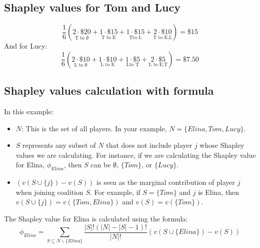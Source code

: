 \documentclass[12pt]{article}
\begin{document}
\subsection{Shapley values for Tom and Lucy}
\begin{equation}
\frac{1}{6} \left( 
\underset{\text{T to } \emptyset}{2 \cdot \$20} + 
\underset{\text{T to E}}{1 \cdot \$15} + 
\underset{\text{Tto L}}{1 \cdot \$15} + 
\underset{\text{T to E,L}}{2 \cdot \$10} 
\right) = \$15
\label{eq:tom_shapley}
\end{equation}
And for Lucy:
\begin{equation}
\frac{1}{6} \left( 
\underset{\text{L to } \emptyset}{2 \cdot \$10} + 
\underset{\text{L to E}}{1 \cdot \$10} + 
\underset{\text{Lto T}}{1 \cdot \$5} + 
\underset{\text{L to E,T}}{2 \cdot \$5} 
\right) = \$7.50
\label{eq:lucy_shapley}
\end{equation}

\subsection{Shapley values calculation with formula }
In this example:
\begin{itemize}
	\item \(N\): This is the set of all players. In your example, \(N = \{Elina, Tom, Lucy\}\).
	\item \(S\) represents any subset of \(N\) that does not include player \(j\) whose Shapley values we are calculating. For instance, if we are calculating the Shapley value for Elina, \(\phi_{Elina}\), then \(S\) can be \(\emptyset\), \(\{Tom\}\), or \(\{Lucy\}\).
	\item \((v(S \cup \{j\}) - v(S))\) is seen as the marginal contribution of player \(j\) when joining coalition \(S\). For example, if \(S = \{Tom\}\) and \(j\) is Elina, then \(v(S \cup \{j\}) = v(\{Tom, Elina\})\) and \(v(S) = v(\{Tom\})\).
\end{itemize}

The Shapley value for Elina is calculated using the formula:
\[
\phi_{Elina} = \sum_{S \subseteq N\backslash\{Elina\}} \frac{|S|!(|N| - |S| - 1)!}{|N|!}(v(S \cup \{Elina\}) - v(S))
\]
\end{document}

